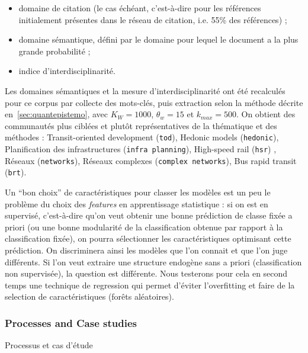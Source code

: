 \begin{itemize}
\item domaine de citation (le cas échéant, c'est-à-dire pour les références initialement présentes dans le réseau de citation, i.e. 55\% des références) ;
\item domaine sémantique, défini par le domaine pour lequel le document a la plus grande probabilité ;
\item indice d'interdisciplinarité.
\end{itemize}

Les domaines sémantiques et la mesure d'interdisciplinarité ont été recalculés pour ce corpus par collecte des mots-clés, puis extraction selon la méthode décrite en~\ref{sec:quantepistemo}, avec $K_W=1000$, $\theta_w=15$ et $k_{max}=500$. On obtient des communautés plus ciblées et plutôt représentatives de la thématique et des méthodes : Transit-oriented development (\texttt{tod}), Hedonic models (\texttt{hedonic}), Planification des infrastructures (\texttt{infra planning}), High-speed rail (\texttt{hsr}) , Réseaux (\texttt{networks}), Réseaux complexes (\texttt{complex networks}), Bus rapid transit (\texttt{brt}).


Un ``bon choix'' de caractéristiques pour classer les modèles est un peu le problème du choix des \emph{features} en apprentissage statistique : si on est en supervisé, c'est-à-dire qu'on veut obtenir une bonne prédiction de classe fixée a priori (ou une bonne modularité de la classification obtenue par rapport à la classification fixée), on pourra sélectionner les caractéristiques optimisant cette prédiction. On discriminera ainsi les modèles que l'on connait et que l'on juge différents. Si l'on veut extraire une structure endogène sans a priori (classification non supervisée), la question est différente. Nous testerons pour cela en second temps une technique de regression qui permet d'éviter l'overfitting et faire de la selection de caractéristiques (forêts aléatoires).



\subsubsection{Processes and Case studies}{Processus et cas d'étude}

